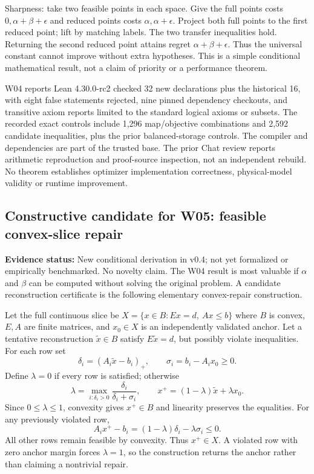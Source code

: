 \documentclass[11pt,letterpaper]{article}
\newcommand{\status}[1]{\textbf{Evidence status:} #1}
\begin{document}
Sharpness: take two feasible points in each space. Give the full points costs $0,\alpha+\beta+\epsilon$ and reduced points costs $\alpha,\alpha+\epsilon$. Project both full points to the first reduced point; lift by matching labels. The two transfer inequalities hold. Returning the second reduced point attains regret $\alpha+\beta+\epsilon$. Thus the universal constant cannot improve without extra hypotheses. This is a simple conditional mathematical result, not a claim of priority or a performance theorem.

W04 reports Lean 4.30.0-rc2 checked 32 new declarations plus the historical 16, with eight false statements rejected, nine pinned dependency checkouts, and transitive axiom reports limited to the standard logical axioms or subsets. The recorded exact controls include 1,296 map/objective combinations and 2,592 candidate inequalities, plus the prior balanced-storage controls. The compiler and dependencies are part of the trusted base. The prior Chat review reports arithmetic reproduction and proof-source inspection, not an independent rebuild. No theorem establishes optimizer implementation correctness, physical-model validity or runtime improvement.

\subsection{Constructive candidate for W05: feasible convex-slice repair}
\label{sec:repair}
\status{New conditional derivation in v0.4; not yet formalized or empirically benchmarked. No novelty claim.}
The W04 result is most valuable if $\alpha$ and $\beta$ can be computed without solving the original problem. A candidate reconstruction certificate is the following elementary convex-repair construction.

Let the full continuous slice be $X=\{x\in B: Ex=d,\ Ax\le b\}$ where $B$ is convex, $E,A$ are finite matrices, and $x_0\in X$ is an independently validated anchor. Let a tentative reconstruction $\tilde x\in B$ satisfy $E\tilde x=d$, but possibly violate inequalities. For each row set
\[
 \delta_i=(A_i\tilde x-b_i)_+,\qquad
 \sigma_i=b_i-A_ix_0\ge0.
\]
Define $\lambda=0$ if every row is satisfied; otherwise
\[
 \lambda=\max_{i:\delta_i>0}
       \frac{\delta_i}{\delta_i+\sigma_i},\qquad
 x^+=(1-\lambda)\tilde x+\lambda x_0.
\]
Since $0\le\lambda\le1$, convexity gives $x^+\in B$ and linearity preserves the equalities. For any previously violated row,
\[
 A_i x^+-b_i=(1-\lambda)\delta_i-\lambda\sigma_i\le0.
\]
All other rows remain feasible by convexity. Thus $x^+\in X$. A violated row with zero anchor margin forces $\lambda=1$, so the construction returns the anchor rather than claiming a nontrivial repair.
\end{document}
